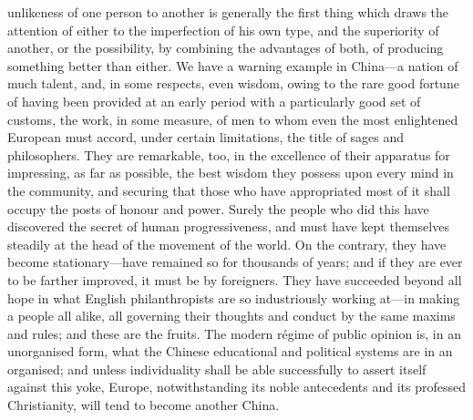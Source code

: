 \documentclass[12pt]{article}
\begin{document}
unlikeness of one person to another is generally the first thing which draws the attention of either to the imperfection of his own type, and the superiority of another, or the possibility, by combining the advantages of both, of producing something better than either. We have a warning example in China---a nation of much talent, and, in some respects, even wisdom, owing to the rare good fortune of having been provided at an early period with a particularly good set of customs, the work, in some measure, of men to whom even the most enlightened European must accord, under certain limitations, the title of sages and philosophers. They are remarkable, too, in the excellence of their apparatus for impressing, as far as possible, the best wisdom they possess upon every mind in the community, and securing that those who have appropriated most of it shall occupy the posts of honour and power. Surely the people who did this have discovered the secret of human progressiveness, and must have kept themselves steadily at the head of the movement of the world. On the contrary, they have become stationary---have remained so for thousands of years; and if they are ever to be farther improved, it must be by foreigners. They have succeeded beyond all hope in what English philanthropists are so industriously working at---in making a people all alike, all governing their thoughts and conduct by the same maxims and rules; and these are the fruits. The modern régime of public opinion is, in an unorganised form, what the Chinese educational and political systems are in an organised; and unless individuality shall be able successfully to assert itself against this yoke, Europe, notwithstanding its noble antecedents and its professed Christianity, will tend to become another China.
\end{document}

